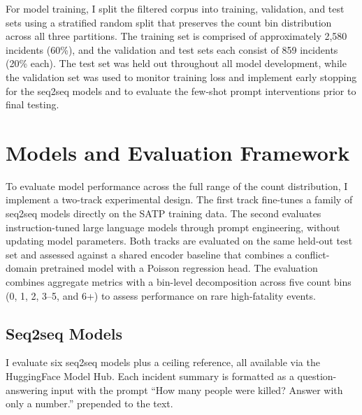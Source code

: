 \documentclass[
  11pt,
]{article}
\begin{document}
For model training, I split the filtered corpus into training,
validation, and test sets using a stratified random split that preserves
the count bin distribution across all three partitions. The training set
is comprised of approximately 2,580 incidents (60\%), and the validation
and test sets each consist of 859 incidents (20\% each). The test set
was held out throughout all model development, while the validation set
was used to monitor training loss and implement early stopping for the
seq2seq models and to evaluate the few-shot prompt interventions prior
to final testing.

\section{Models and Evaluation
Framework}\label{models-and-evaluation-framework}

To evaluate model performance across the full range of the count
distribution, I implement a two-track experimental design. The first
track fine-tunes a family of seq2seq models directly on the SATP
training data. The second evaluates instruction-tuned large language
models through prompt engineering, without updating model parameters.
Both tracks are evaluated on the same held-out test set and assessed
against a shared encoder baseline that combines a conflict-domain
pretrained model with a Poisson regression head. The evaluation combines
aggregate metrics with a bin-level decomposition across five count bins
(0, 1, 2, 3--5, and 6+) to assess performance on rare high-fatality
events.

\subsection{Seq2seq Models}\label{seq2seq-models}

I evaluate six seq2seq models plus a ceiling reference, all available
via the HuggingFace Model Hub. Each incident summary is formatted as a
question-answering input with the prompt ``How many people were killed?
Answer with only a number.'' prepended to the text.
\end{document}
